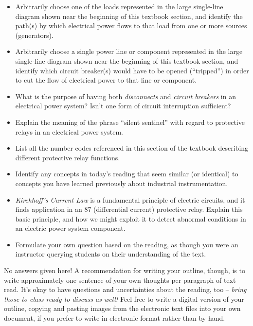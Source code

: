 \begin{itemize}
\item{} Arbitrarily choose one of the loads represented in the large single-line diagram shown near the beginning of this textbook section, and identify the path(s) by which electrical power flows to that load from one or more sources (generators).
\item{} Arbitrarily choose a single power line or component represented in the large single-line diagram shown near the beginning of this textbook section, and identify which circuit breaker(s) would have to be opened (``tripped'') in order to cut the flow of electrical power to that line or component.
\item{} What is the purpose of having both {\it disconnects} and {\it circuit breakers} in an electrical power system?  Isn't one form of circuit interruption sufficient?
\item{} Explain the meaning of the phrase ``silent sentinel'' with regard to protective relays in an electrical power system.
\item{} List all the number codes referenced in this section of the textbook describing different protective relay functions.
\item{} Identify any concepts in today's reading that seem similar (or identical) to concepts you have learned previously about industrial instrumentation.
\item{} {\it Kirchhoff's Current Law} is a fundamental principle of electric circuits, and it finds application in an 87 (differential current) protective relay.  Explain this basic principle, and how we might exploit it to detect abnormal conditions in an electric power system component.
\item{} Formulate your own question based on the reading, as though you were an instructor querying students on their understanding of the text.
\end{itemize}







No answers given here!  A recommendation for writing your outline, though, is to write approximately one sentence of your own thoughts per paragraph of text read.  It's okay to have questions and uncertainties about the reading, too -- {\it bring those to class ready to discuss as well!}  Feel free to write a digital version of your outline, copying and pasting images from the electronic text files into your own document, if you prefer to write in electronic format rather than by hand.

